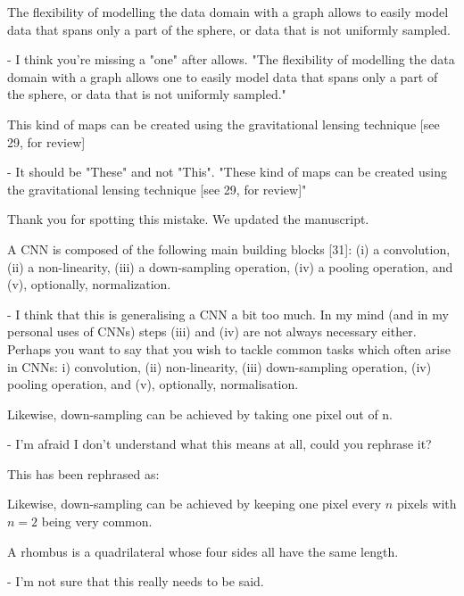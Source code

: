 \documentclass[12pt,a4paper]{article}
\newcommand{\nati}[1]{{\color[rgb]{.1,.6,.1}{NP: #1}}}
\newcommand{\todo}[1]{{\color[rgb]{.6,.1,.6}{TODO: #1}}}
\newcommand{\1}{\b{1}}              %
\newcommand{\0}{\b{0}}              %
\begin{document}
\begin{mdframed}[style=comment] 
The flexibility of modelling the data domain with a graph allows to easily model data that spans only a part of the sphere, or data that is not uniformly sampled.

- I think you're missing a "one" after allows. "The flexibility of modelling the data domain with a graph allows one to easily model data that spans only a part of the sphere, or data that is not uniformly sampled."
\end{mdframed}
\todo{assigned: @tomek}
\nati{I am not sure of the english here.}

\begin{mdframed}[style=comment] 
This kind of maps can be created using the gravitational lensing technique [see 29, for review]

- It should be "These" and not "This". "These kind of maps can be created using the gravitational lensing technique [see 29, for review]"
\end{mdframed}
Thank you for spotting this mistake. We updated the manuscript.

\begin{mdframed}[style=comment] 
A CNN is composed of the following main building blocks [31]: (i) a convolution, (ii) a non-linearity, (iii) a down-sampling operation, (iv) a pooling operation, and (v), optionally, normalization.

- I think that this is generalising a CNN a bit too much. In my mind (and in my personal uses of CNNs) steps (iii) and (iv) are not always necessary either. Perhaps you want to say that you wish to tackle common tasks which often arise in CNNs: i) convolution, (ii) non-linearity, (iii) down-sampling operation, (iv) pooling operation, and (v), optionally, normalisation.
\end{mdframed}
\todo{assigned: @michael}


\begin{mdframed}[style=comment] 
Likewise, down-sampling can be achieved by taking one pixel out of n.

- I'm afraid I don't understand what this means at all, could you rephrase it?
\end{mdframed}
This has been rephrased as:
\begin{mdframed}[style=manuscript] 
Likewise, down-sampling can be achieved by keeping one pixel every $n$ pixels with $n=2$ being very common.
\end{mdframed}

\begin{mdframed}[style=comment] 
A rhombus is a quadrilateral whose four sides all have the same length.

- I'm not sure that this really needs to be said.
\end{mdframed}
\todo{assigned: @michael}
\end{document}
